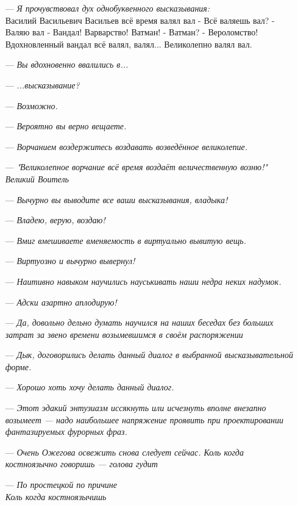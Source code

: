 \begin{itemize}
    \item[---] \emph{Я прочувствовал дух однобуквенного высказывания:}\\
    Василий Васильевич Васильев всё время валял вал
  - Всё валяешь вал?
  - Валяю вал
  - Вандал! Варварство! Ватман!
  - Ватман?
  - Вероломство!
  Вдохновленный вандал всё валял, валял... Великолепно валял вал.
  \item[---] \emph{Вы вдохновенно ввалились в...}
  \item[---] \emph{...высказывание?}
  \item[---] \emph{Возможно.}
  \item[---] \emph{Вероятно вы верно вещаете.}
  \item[---] \emph{Ворчанием воздержитесь воздавать возведённое великолепие.}
  \item[---] \emph{"Великолепное ворчание всё время воздаёт величественную возню!"\\
Великий Воитель}
  \item[---] \emph{Вычурно вы выводите все ваши высказывания, владыка!}
  \item[---] \emph{Владею, верую, воздаю!}
   \item[---] \emph{Вмиг вмешиваете вменяемость в виртуально вывитую вещь.}
  \item[---] \emph{Виртуозно и вычурно вывернул!}
  \item[---] \emph{Наитивно навыком научились науськивать наши недра неких надумок.}
  \item[---] \emph{Адски азартно аплодирую!}
  \item[---] \emph{Да, довольно дельно думать научился на наших беседах без больших затрат за звено времени возымевшимся в своём распоряжении}
  \item[---] \emph{Дык, договорились делать данный диалог в выбранной высказывательной форме.}
  \item[---] \emph{Хорошо хоть хочу делать данный диалог.}
  \item[---] \emph{Этот эдакий энтузиазм иссякнуть или исчезнуть вполне внезапно возымеет ---
  надо наибольшее напряжение проявить при проектировании фантазируемых фурорных фраз.}
  \item[---] \emph{Очень Ожегова освежить снова следует сейчас. 
Коль когда костноязычно говоришь --- голова гудит}
  \item[---] \emph{По простецкой по причине\\
                  Коль когда костноязычишь\\
}
\end{itemize}
